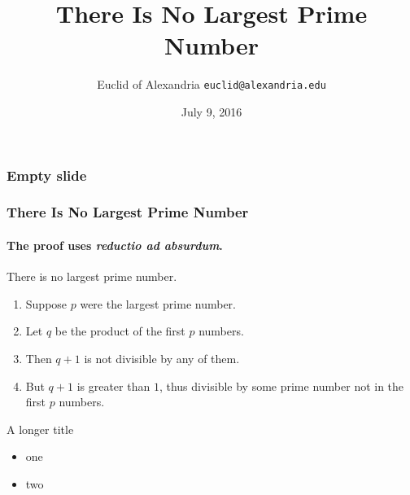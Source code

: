 \documentclass{beamer}
\title{There Is No Largest Prime Number}
\date{July 9, 2016}
\author{Euclid of Alexandria \texttt{euclid@alexandria.edu}}
\begin{document}
\insertTitleSlide

\begin{frame}
\frametitle{Empty slide} 

\end{frame}


\begin{frame} 
\frametitle{There Is No Largest Prime Number} 
\framesubtitle{The proof uses \textit{reductio ad absurdum}.} 
\begin{theorem}
There is no largest prime number. \end{theorem} 
\begin{enumerate} 
\item<1-| alert@1> Suppose $p$ were the largest prime number. 
\item<2-> Let $q$ be the product of the first $p$ numbers. 
\item<3-> Then $q+1$ is not divisible by any of them. 
\item<1-> But $q + 1$ is greater than $1$, thus divisible by some prime
number not in the first $p$ numbers.
\end{enumerate}
\end{frame}

\begin{frame}{A longer title}
\begin{itemize}
\item one
\item two
\end{itemize}
\end{frame}
\end{document}

